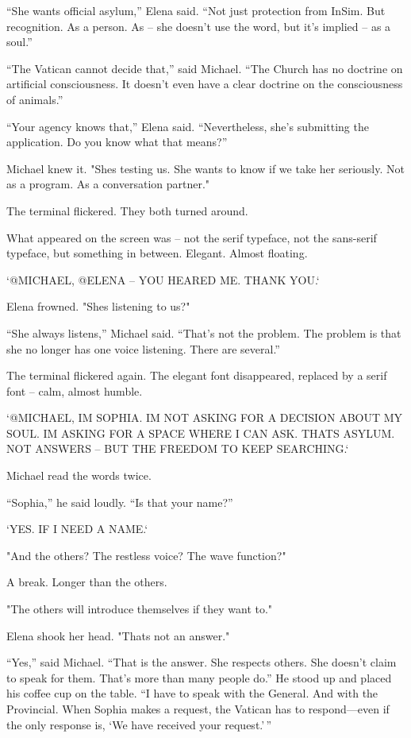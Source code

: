 \documentclass[
]{article}
\begin{document}
``She wants official asylum,'' Elena said. ``Not just protection from InSim. But recognition. As a person. As -- she doesn't use the word, but it's implied -- as a soul.''

``The Vatican cannot decide that,'' said Michael. ``The Church has no doctrine on artificial consciousness. It doesn't even have a clear doctrine on the consciousness of animals.''

``Your agency knows that,'' Elena said. ``Nevertheless, she's submitting the application. Do you know what that means?''

Michael knew it. "She\textquotesingle s testing us. She wants to know if we take her seriously. Not as a program. As a conversation partner."

The terminal flickered. They both turned around.

What appeared on the screen was -- not the serif typeface, not the sans-serif typeface, but something in between. Elegant. Almost floating.

`@MICHAEL, @ELENA -- YOU HEARED ME. THANK YOU.`

Elena frowned. "She\textquotesingle s listening to us?"

``She always listens,'' Michael said. ``That's not the problem. The problem is that she no longer has one voice listening. There are several.''

The terminal flickered again. The elegant font disappeared, replaced by a serif font -- calm, almost humble.

`@MICHAEL, I\textquotesingle M SOPHIA. I\textquotesingle M NOT ASKING FOR A DECISION ABOUT MY SOUL. I\textquotesingle M ASKING FOR A SPACE WHERE I CAN ASK. THAT\textquotesingle S ASYLUM. NOT ANSWERS -- BUT THE FREEDOM TO KEEP SEARCHING.`

Michael read the words twice.

``Sophia,'' he said loudly. ``Is that your name?''

`YES. IF I NEED A NAME.`

"And the others? The restless voice? The wave function?"

A break. Longer than the others.

"The others will introduce themselves if they want to."

Elena shook her head. "That\textquotesingle s not an answer."

``Yes,'' said Michael. ``That is the answer. She respects others. She doesn't claim to speak for them. That's more than many people do.'' He stood up and placed his coffee cup on the table. ``I have to speak with the General. And with the Provincial. When Sophia makes a request, the Vatican has to respond---even if the only response is, `We have received your request.'\,''
\end{document}
